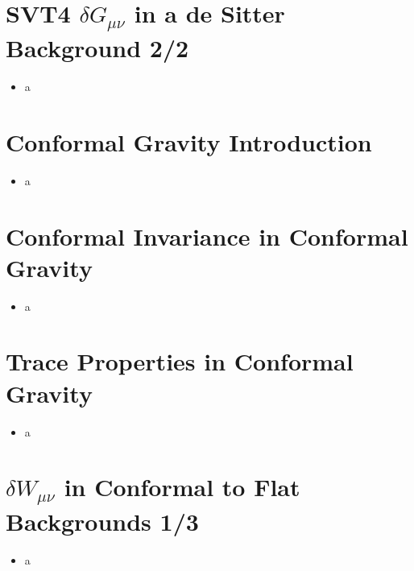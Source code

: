 \documentclass[10pt,letterpaper]{article}
\numberwithin{equation}{section}
\begin{document}
\section{SVT4 $\delta G_{\mu\nu}$ in a de Sitter Background 2/2}
\begin{itemize}
	\item a
\end{itemize}


\section{Conformal Gravity Introduction}
\begin{itemize}
	\item a
\end{itemize}


\section{Conformal Invariance in Conformal Gravity}
\begin{itemize}
	\item a
\end{itemize}


\section{Trace Properties in Conformal Gravity}
\begin{itemize}
	\item a
\end{itemize}


\section{$\delta W_{\mu\nu}$ in Conformal to Flat Backgrounds 1/3}
\begin{itemize}
	\item a
\end{itemize}
\end{document}
